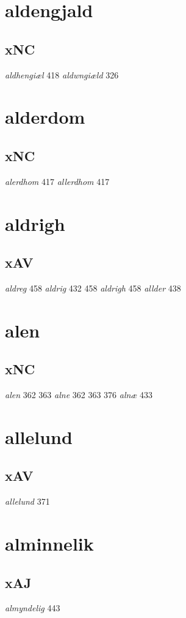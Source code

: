 \documentclass[a4paper,twocolumn]{article}
\begin{document}
\section{aldengjald}
\label{sec:orga5ac658}
\subsection{xNC}
\label{sec:org2315200}
\emph{aldhengiæl} 418 \emph{aldwngiæld} 326 
\section{alderdom}
\label{sec:orge4bcc7b}
\subsection{xNC}
\label{sec:org0f64a0d}
\emph{alerdhom} 417 \emph{allerdhom} 417 
\section{aldrigh}
\label{sec:org2d865f8}
\subsection{xAV}
\label{sec:org2c8b1be}
\emph{aldreg} 458 \emph{aldrig} 432 458 \emph{aldrigh} 458 \emph{allder} 438 
\section{alen}
\label{sec:orga2bca4a}
\subsection{xNC}
\label{sec:org1ba815a}
\emph{alen} 362 363 \emph{alne} 362 363 376 \emph{alnæ} 433 
\section{allelund}
\label{sec:org9fa4367}
\subsection{xAV}
\label{sec:org48bb546}
\emph{allelund} 371 
\section{alminnelik}
\label{sec:orgfda2021}
\subsection{xAJ}
\label{sec:orgd6e4b5f}
\emph{almyndelig} 443 
\end{document}
